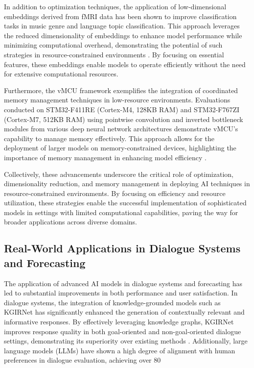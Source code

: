 In addition to optimization techniques, the application of low-dimensional embeddings derived from fMRI data has been shown to improve classification tasks in music genre and language topic classification. This approach leverages the reduced dimensionality of embeddings to enhance model performance while minimizing computational overhead, demonstrating the potential of such strategies in resource-constrained environments \cite{raposo2019lowdimensionalembodiedsemanticsmusic}. By focusing on essential features, these embeddings enable models to operate efficiently without the need for extensive computational resources.



Furthermore, the vMCU framework exemplifies the integration of coordinated memory management techniques in low-resource environments. Evaluations conducted on STM32-F411RE (Cortex-M4, 128KB RAM) and STM32-F767ZI (Cortex-M7, 512KB RAM) using pointwise convolution and inverted bottleneck modules from various deep neural network architectures demonstrate vMCU's capability to manage memory effectively. This approach allows for the deployment of larger models on memory-constrained devices, highlighting the importance of memory management in enhancing model efficiency \cite{zheng2024vmcucoordinatedmemorymanagement}.



Collectively, these advancements underscore the critical role of optimization, dimensionality reduction, and memory management in deploying AI techniques in resource-constrained environments. By focusing on efficiency and resource utilization, these strategies enable the successful implementation of sophisticated models in settings with limited computational capabilities, paving the way for broader applications across diverse domains.



\subsection{Real-World Applications in Dialogue Systems and Forecasting} \label{subsec:Real-World Applications in Dialogue Systems and Forecasting}

The application of advanced AI models in dialogue systems and forecasting has led to substantial improvements in both performance and user satisfaction. In dialogue systems, the integration of knowledge-grounded models such as KGIRNet has significantly enhanced the generation of contextually relevant and informative responses. By effectively leveraging knowledge graphs, KGIRNet improves response quality in both goal-oriented and non-goal-oriented dialogue settings, demonstrating its superiority over existing methods \cite{chaudhuri2021groundingdialoguesystemsknowledge}. Additionally, large language models (LLMs) have shown a high degree of alignment with human preferences in dialogue evaluation, achieving over 80%



